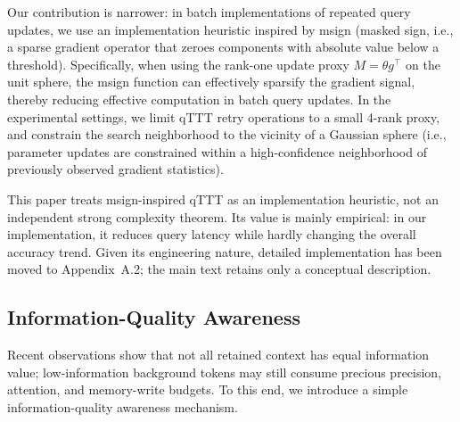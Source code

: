 \documentclass[11pt,a4paper]{article}
\theoremstyle{plain}
\theoremstyle{definition}
\begin{document}
Our contribution is narrower: in batch implementations of repeated query updates, we use an implementation heuristic inspired by msign (masked sign, i.e., a sparse gradient operator that zeroes components with absolute value below a threshold). Specifically, when using the rank-one update proxy $M = \theta g^{\top}$ on the unit sphere, the msign function can effectively sparsify the gradient signal, thereby reducing effective computation in batch query updates. In the experimental settings, we limit qTTT retry operations to a small 4-rank proxy, and constrain the search neighborhood to the vicinity of a Gaussian sphere (i.e., parameter updates are constrained within a high-confidence neighborhood of previously observed gradient statistics).

This paper treats msign-inspired qTTT as an implementation heuristic, not an independent strong complexity theorem. Its value is mainly empirical: in our implementation, it reduces query latency while hardly changing the overall accuracy trend. Given its engineering nature, detailed implementation has been moved to Appendix~A.2; the main text retains only a conceptual description.

\subsection{Information-Quality Awareness}

Recent observations show that not all retained context has equal information value; low-information background tokens may still consume precious precision, attention, and memory-write budgets. To this end, we introduce a simple information-quality awareness mechanism.
\end{document}
